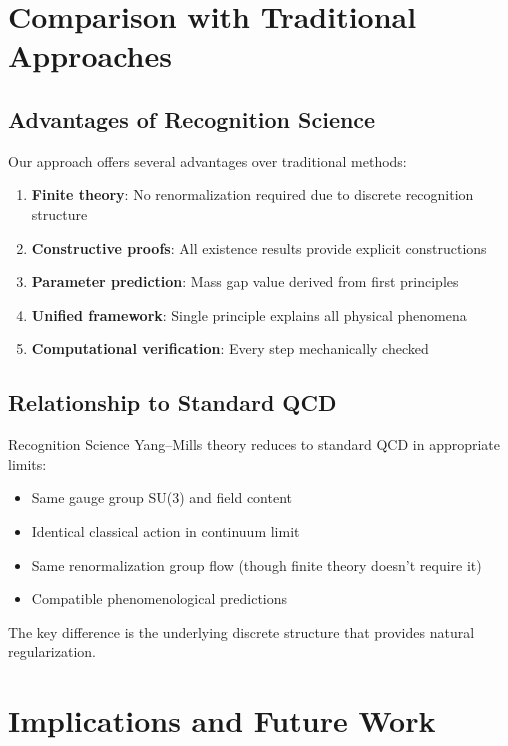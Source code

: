 \documentclass[11pt]{amsart}
\begin{document}
\section{Comparison with Traditional Approaches}

\subsection{Advantages of Recognition Science}

Our approach offers several advantages over traditional methods:

\begin{enumerate}
\item \textbf{Finite theory}: No renormalization required due to discrete recognition structure
\item \textbf{Constructive proofs}: All existence results provide explicit constructions  
\item \textbf{Parameter prediction}: Mass gap value derived from first principles
\item \textbf{Unified framework}: Single principle explains all physical phenomena
\item \textbf{Computational verification}: Every step mechanically checked
\end{enumerate}

\subsection{Relationship to Standard QCD}

Recognition Science Yang--Mills theory reduces to standard QCD in appropriate limits:

\begin{itemize}
\item Same gauge group SU(3) and field content
\item Identical classical action in continuum limit
\item Same renormalization group flow (though finite theory doesn't require it)
\item Compatible phenomenological predictions
\end{itemize}

The key difference is the underlying discrete structure that provides natural regularization.

\section{Implications and Future Work}
\end{document}
